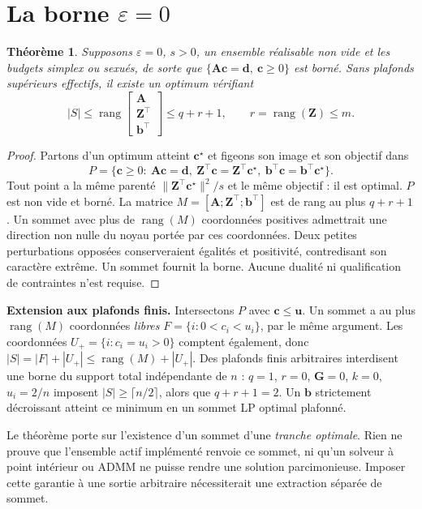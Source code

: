\documentclass[11pt]{article}
\theoremstyle{plain}
\newtheorem{theoreme}{Théorème}
\newcommand{\tp}{^{\top}}
\newcommand{\bc}{\mathbf{c}}
\newcommand{\bb}{\mathbf{b}}
\newcommand{\bG}{\mathbf{G}}
\newcommand{\bZ}{\mathbf{Z}}
\newcommand{\bA}{\mathbf{A}}
\newcommand{\bd}{\mathbf{d}}
\newcommand{\bu}{\mathbf{u}}
\begin{document}
\section{La borne \texorpdfstring{$\varepsilon = 0$}{eps=0}}\label{sec:eps0}

\begin{theoreme}\label{thm:eps0}
Supposons $\varepsilon=0$, $s>0$, un ensemble réalisable non vide et les budgets simplex ou sexués, de sorte que $\{\bA\bc=\bd,\ \bc\ge0\}$ est borné. Sans plafonds supérieurs effectifs, il existe un optimum vérifiant
\[
 |S|\le\operatorname{rang}\!\begin{bmatrix}\bA\\\bZ\tp\\\bb\tp\end{bmatrix}\le q+r+1,
 \qquad r=\operatorname{rang}(\bZ)\le m.
\]
\end{theoreme}
\begin{proof}
Partons d'un optimum atteint $\bc^\star$ et figeons son image et son objectif dans
\[
 P=\{\bc\ge0:\ \bA\bc=\bd,\ \bZ\tp\bc=\bZ\tp\bc^\star,\ \bb\tp\bc=\bb\tp\bc^\star\}.
\]
Tout point a la même parenté $\|\bZ\tp\bc^\star\|^2/s$ et le même objectif : il est optimal. $P$ est non vide et borné. La matrice $M=[\bA;\bZ\tp;\bb\tp]$ est de rang au plus $q+r+1$. Un sommet avec plus de $\operatorname{rang}(M)$ coordonnées positives admettrait une direction non nulle du noyau portée par ces coordonnées. Deux petites perturbations opposées conserveraient égalités et positivité, contredisant son caractère extrême. Un sommet fournit la borne. Aucune dualité ni qualification de contraintes n'est requise.
\end{proof}

\textbf{Extension aux plafonds finis.} Intersectons $P$ avec $\bc\le\bu$. Un sommet a au plus $\operatorname{rang}(M)$ coordonnées \emph{libres} $F=\{i:0<c_i<u_i\}$, par le même argument. Les coordonnées $U_+=\{i:c_i=u_i>0\}$ comptent également, donc $|S|=|F|+|U_+|\le\operatorname{rang}(M)+|U_+|$. Des plafonds finis arbitraires interdisent une borne du support total indépendante de $n$ : $q=1$, $r=0$, $\bG=0$, $k=0$, $u_i=2/n$ imposent $|S|\ge\lceil n/2\rceil$, alors que $q+r+1=2$. Un $\bb$ strictement décroissant atteint ce minimum en un sommet LP optimal plafonné.

Le théorème porte sur l'existence d'un sommet d'une \emph{tranche optimale}. Rien ne prouve que l'ensemble actif implémenté renvoie ce sommet, ni qu'un solveur à point intérieur ou ADMM ne puisse rendre une solution parcimonieuse. Imposer cette garantie à une sortie arbitraire nécessiterait une extraction séparée de sommet.
\end{document}
